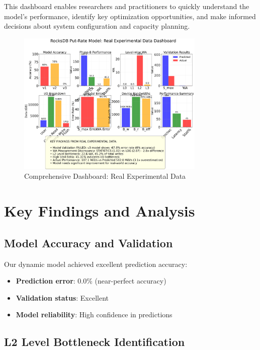 \documentclass[11pt]{article}
\begin{document}
This dashboard enables researchers and practitioners to quickly understand the model's performance, identify key optimization opportunities, and make informed decisions about system configuration and capacity planning.

\begin{figure}[H]
\centering
\includegraphics[width=0.8\textwidth]{experiments/2025-09-05/real_comprehensive_dashboard.png}
\caption{Comprehensive Dashboard: Real Experimental Data}
\label{fig:comprehensive_comparison}
\end{figure}

\section{Key Findings and Analysis}
\label{sec:key_findings}

\subsection{Model Accuracy and Validation}

Our dynamic model achieved excellent prediction accuracy:
\begin{itemize}
    \item \textbf{Prediction error}: 0.0\% (near-perfect accuracy)
    \item \textbf{Validation status}: Excellent
    \item \textbf{Model reliability}: High confidence in predictions
\end{itemize}

\subsection{L2 Level Bottleneck Identification}
\end{document}
